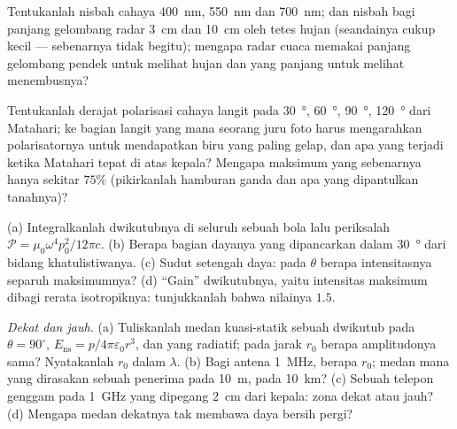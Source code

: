 \begin{exercise}[$\star$]\label{exo:b2:dipole-radiation:3}
Tentukanlah nisbah  cahaya \qty{400}{nm}, \qty{550}{nm} dan
\qty{700}{nm}; dan nisbah bagi panjang gelombang radar \qty{3}{cm} dan \qty{10}{cm} oleh
tetes hujan (seandainya cukup kecil --- sebenarnya tidak begitu); mengapa
radar cuaca memakai panjang gelombang pendek untuk melihat hujan dan yang panjang untuk melihat
menembusnya?
\end{exercise}

\begin{exercise}[$\star$]\label{exo:b2:dipole-radiation:4}
Tentukanlah derajat polarisasi cahaya langit pada \qty{30}{\degree}, \qty{60}{\degree},
\qty{90}{\degree}, \qty{120}{\degree} dari Matahari; ke bagian langit yang mana seorang
juru foto harus mengarahkan polarisatornya untuk mendapatkan biru yang paling gelap, dan apa yang
terjadi ketika Matahari tepat di atas kepala? Mengapa maksimum yang sebenarnya hanya sekitar
$75\%$ (pikirkanlah hamburan ganda dan apa yang dipantulkan tanahnya)?
\end{exercise}

\begin{exercise}[$\star\star$]\label{exo:b2:dipole-radiation:5}
(a) Integralkanlah  dwikutubnya di seluruh sebuah bola lalu
periksalah $\mathcal P = \mu_0\omega^4p_0^2/12\pi c$. (b) Berapa bagian dayanya yang
dipancarkan dalam \qty{30}{\degree} dari bidang khatulistiwanya. (c) Sudut
setengah daya: pada $\theta$ berapa intensitasnya separuh maksimumnya? (d) ``Gain''
dwikutubnya, yaitu intensitas maksimum dibagi rerata isotropiknya:
tunjukkanlah bahwa nilainya $1.5$.
\end{exercise}

\begin{exercise}[$\star\star$]\label{exo:b2:dipole-radiation:6}
\emph{Dekat dan jauh.} (a) Tuliskanlah medan kuasi-statik sebuah dwikutub pada
$\theta = 90^\circ$, $E_{\text{ns}} = p/4\pi\varepsilon_0r^3$, dan yang radiatif; pada
jarak $r_0$ berapa amplitudonya sama? Nyatakanlah $r_0$ dalam
$\lambda$. (b) Bagi antena \qty{1}{MHz}, berapa $r_0$; medan mana yang dirasakan sebuah penerima
pada \qty{10}{m}, pada \qty{10}{km}? (c) Sebuah telepon genggam pada \qty{1}{GHz} yang dipegang
\qty{2}{cm} dari kepala: zona dekat atau jauh? (d) Mengapa medan dekatnya
tak membawa daya bersih pergi?
\end{exercise}

